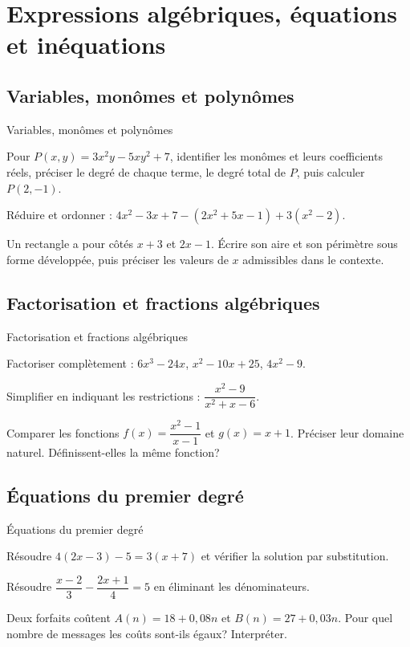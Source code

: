 \chapter{Expressions algébriques, équations et inéquations}
\label{workbook:chapter:02}
\section{Variables, monômes et polynômes}
\label{workbook:section:02.01}
\begin{exerciseblock}{Variables, monômes et polynômes}
\item Pour $P(x,y)=3x^2y-5xy^2+7$, identifier les monômes et leurs coefficients réels, préciser le degré de chaque terme, le degré total de $P$, puis calculer $P(2,-1)$.
\item Réduire et ordonner : $4x^2-3x+7-(2x^2+5x-1)+3(x^2-2)$.
\item Un rectangle a pour côtés $x+3$ et $2x-1$. Écrire son aire et son périmètre sous forme développée, puis préciser les valeurs de $x$ admissibles dans le contexte.
\end{exerciseblock}
\section{Factorisation et fractions algébriques}
\label{workbook:section:02.02}
\begin{exerciseblock}{Factorisation et fractions algébriques}
\item Factoriser complètement : $6x^3-24x$, $x^2-10x+25$, $4x^2-9$.
\item Simplifier en indiquant les restrictions : $\dfrac{x^2-9}{x^2+x-6}$.
\item Comparer les fonctions $f(x)=\dfrac{x^2-1}{x-1}$ et $g(x)=x+1$. Préciser leur domaine naturel. Définissent-elles la même fonction?
\end{exerciseblock}
\section{Équations du premier degré}
\label{workbook:section:02.03}
\begin{exerciseblock}{Équations du premier degré}
\item Résoudre $4(2x-3)-5=3(x+7)$ et vérifier la solution par substitution.
\item Résoudre $\dfrac{x-2}{3}-\dfrac{2x+1}{4}=5$ en éliminant les dénominateurs.
\item Deux forfaits coûtent $A(n)=18+0{,}08n$ et $B(n)=27+0{,}03n$. Pour quel nombre de messages les coûts sont-ils égaux? Interpréter.
\end{exerciseblock}

